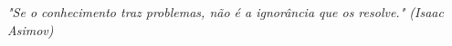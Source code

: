 
\renewcommand{\epigraphname}{EPÍGRAFE}

\begin{epigrafe}

\textit{"Se o conhecimento traz problemas, não é a ignorância que os resolve." (Isaac Asimov)}

\end{epigrafe}


